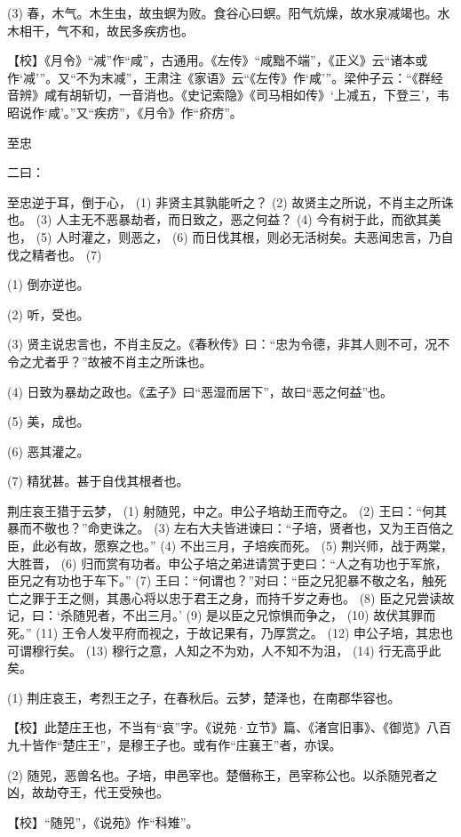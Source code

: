 \documentclass[12pt,UTF8]{ctexbook}
\begin{document}
(3) 春，木气。木生虫，故虫螟为败。食谷心曰螟。阳气炕燥，故水泉减竭也。水木相干，气不和，故民多疾疠也。

【校】《月令》“减”作“咸”，古通用。《左传》“咸黜不端”，《正义》云“诸本或作‘减’”。又“不为末减”，王肃注《家语》云“《左传》作‘咸’”。梁仲子云：“《群经音辨》咸有胡斩切，一音消也。《史记索隐》《司马相如传》‘上减五，下登三’，韦昭说作‘咸’。”又“疾疠”，《月令》作“疥疠”。





至忠


二曰：

至忠逆于耳，倒于心， (1) 非贤主其孰能听之？ (2) 故贤主之所说，不肖主之所诛也。 (3) 人主无不恶暴劫者，而日致之，恶之何益？ (4) 今有树于此，而欲其美也， (5) 人时灌之，则恶之， (6) 而日伐其根，则必无活树矣。夫恶闻忠言，乃自伐之精者也。 (7)

(1) 倒亦逆也。

(2) 听，受也。

(3) 贤主说忠言也，不肖主反之。《春秋传》曰：“忠为令德，非其人则不可，况不令之尤者乎？”故被不肖主之所诛也。

(4) 日致为暴劫之政也。《孟子》曰“恶湿而居下”，故曰“恶之何益”也。

(5) 美，成也。

(6) 恶其灌之。

(7) 精犹甚。甚于自伐其根者也。

荆庄哀王猎于云梦， (1) 射随兕，中之。申公子培劫王而夺之。 (2) 王曰：“何其暴而不敬也？”命吏诛之。 (3) 左右大夫皆进谏曰：“子培，贤者也，又为王百倍之臣，此必有故，愿察之也。” (4) 不出三月，子培疾而死。 (5) 荆兴师，战于两棠，大胜晋， (6) 归而赏有功者。申公子培之弟进请赏于吏曰：“人之有功也于军旅，臣兄之有功也于车下。” (7) 王曰：“何谓也？”对曰：“臣之兄犯暴不敬之名，触死亡之罪于王之侧，其愚心将以忠于君王之身，而持千岁之寿也。 (8) 臣之兄尝读故记，曰：‘杀随兕者，不出三月。’ (9) 是以臣之兄惊惧而争之， (10) 故伏其罪而死。” (11) 王令人发平府而视之，于故记果有，乃厚赏之。 (12) 申公子培，其忠也可谓穆行矣。 (13) 穆行之意，人知之不为劝，人不知不为沮， (14) 行无高乎此矣。

(1) 荆庄哀王，考烈王之子，在春秋后。云梦，楚泽也，在南郡华容也。

【校】此楚庄王也，不当有“哀”字。《说苑·立节》篇、《渚宫旧事》、《御览》八百九十皆作“楚庄王”，是穆王子也。或有作“庄襄王”者，亦误。

(2) 随兕，恶兽名也。子培，申邑宰也。楚僭称王，邑宰称公也。以杀随兕者之凶，故劫夺王，代王受殃也。

【校】“随兕”，《说苑》作“科雉”。
\end{document}

